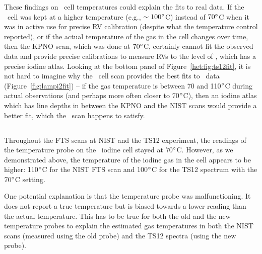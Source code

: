These findings on \het\ cell temperatures could explain the fits to
real data. If the \het\ cell was kept at a higher temperature (e.g.,
$\sim 100^{\circ}$C) instead of $70^{\circ}$C when it was in active use
for precise RV calibration (despite what the temperature control
reported), or if the actual temperature of the gas in the cell changes
over time, then the KPNO scan, which was done at $70^{\circ}$C,
certainly cannot fit the observed data and provide precise
calibrations to measure RVs to the level of \keck, which has a precise
iodine atlas. Looking at the bottom panel of
Figure~\ref{het:fig:ts12fit}, it is not hard to imagine why the \keck\
cell scan provides the best fits to \het\ data
(Figure~\ref{fig:lampi2fit}) -- if the gas temperature is between 70
and 110$^{\circ}$C during actual observations (and perhaps more often
closer to 70$^{\circ}$C), then an iodine atlas which has line depths in
between the KPNO and the NIST scans would provide a better fit, which
the \keck\ scan happens to satisfy.



\subsection{\rev{Cause for a Higher Iodine Gas Temperature}}

Throughout the FTS scans at NIST and the TS12 experiment, the readings
of the temperature probe on the \het\ iodine cell stayed at
70$^{\circ}$C. However, as we demonstrated above, the temperature of
the iodine gas in the cell appears to be higher: 110$^{\circ}$C for the
NIST FTS scan and 100$^{\circ}$C for the TS12 spectrum with the
$70^{\circ}$C setting.

One potential explanation is that the temperature probe was
malfunctioning. It does not report a true temperature but is biased
towards a lower reading than the actual temperature. This has to be
true for both the old and the new temperature probes to explain the
estimated gas temperatures in both the NIST scans (measured using the old
probe) and the TS12 spectra (using the new probe).


